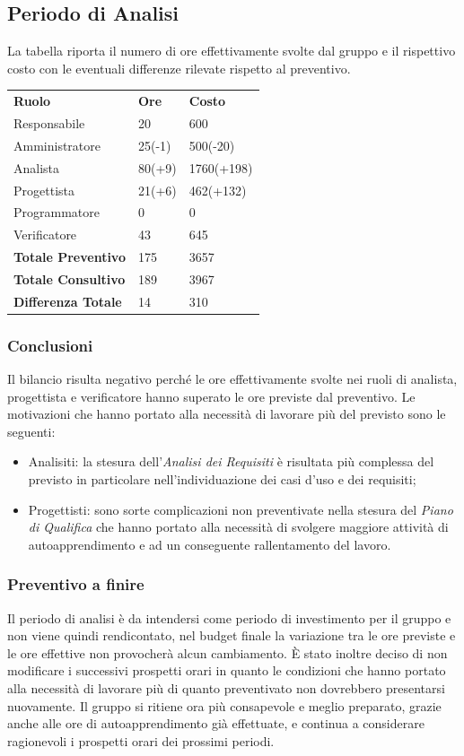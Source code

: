 	\subsection{Periodo di Analisi}
	La tabella riporta il numero di ore effettivamente svolte dal gruppo e il rispettivo costo con le eventuali differenze rilevate rispetto al preventivo.
	\begin{longtable} {							
			>{}p{40mm}  
			>{}p{20mm}	
			>{}p{28mm}			
		}			
		\rowcolor{gray!50}
		
		\textbf{Ruolo} & \textbf{Ore} & \textbf{Costo} \TBstrut \\
		Responsabile & 20 & 600 \TBstrut \\
		Amministratore & 25(-1) & 500(-20) \TBstrut \\
		Analista & 80(+9)& 1760(+198) \TBstrut \\
		Progettista & 21(+6) & 462(+132) \TBstrut \\
		Programmatore & 0 & 0 \TBstrut \\
		Verificatore & 43 & 645 \TBstrut \\
		\textbf{Totale Preventivo} & 175 & 3657	\TBstrut \\	
		\textbf{Totale Consultivo} & 189 & 3967	\TBstrut \\	
		\textbf{Differenza Totale} & 14 & 310 	\TBstrut \\	
	\end{longtable}

		\subsubsection{Conclusioni}
		Il bilancio risulta negativo perché le ore effettivamente svolte nei ruoli di analista, progettista e verificatore hanno superato le ore previste dal preventivo.
		Le motivazioni che hanno portato alla necessità di lavorare più del previsto sono le seguenti:
		\begin{itemize}
			\item Analisiti: la stesura dell'\textit{Analisi dei Requisiti} è risultata più complessa del previsto in particolare nell'individuazione dei casi d'uso e dei requisiti;
			\item Progettisti: sono sorte complicazioni non preventivate nella stesura del \textit{Piano di Qualifica} che hanno portato alla necessità di svolgere maggiore attività di autoapprendimento e ad un conseguente rallentamento del lavoro.
		\end{itemize}
		\subsubsection{Preventivo a finire}
		Il periodo di analisi è da intendersi come periodo di investimento per il gruppo e non viene quindi rendicontato, nel budget finale la variazione tra le ore previste e le ore effettive non provocherà alcun cambiamento. 
		È stato inoltre deciso di non modificare i successivi prospetti orari in quanto le condizioni che hanno portato alla necessità di lavorare più di quanto preventivato non dovrebbero presentarsi nuovamente. Il gruppo si ritiene ora più consapevole e meglio preparato, grazie anche alle ore di autoapprendimento già effettuate, e continua a considerare ragionevoli i prospetti orari dei prossimi periodi.
